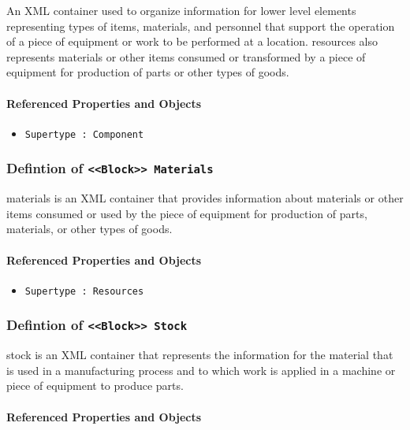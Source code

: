 An XML container used to organize information for lower level elements representing types of items, materials, and personnel that support the operation of a piece of equipment or work to be performed at a location. resources also represents materials or other items consumed or transformed by a piece of equipment for production of parts or other types of goods.

\FloatBarrier
\paragraph{Referenced Properties and Objects}

\begin{itemize}
\item \texttt{Supertype : Component}

\end{itemize}
\FloatBarrier
\subsubsection{Defintion of \texttt{<<Block>> Materials}}
  \label{type:Materials}

\FloatBarrier

materials is an XML container that provides information about materials or other items consumed or used by the piece of equipment for production of parts, materials, or other types of goods.

\FloatBarrier
\paragraph{Referenced Properties and Objects}

\begin{itemize}
\item \texttt{Supertype : Resources}

\end{itemize}
\FloatBarrier
\subsubsection{Defintion of \texttt{<<Block>> Stock}}
  \label{type:Stock}

\FloatBarrier

stock is an XML container that represents the information for the material that is used in a manufacturing process and to which work is applied in a machine or piece of equipment to produce parts.

\FloatBarrier
\paragraph{Referenced Properties and Objects}

